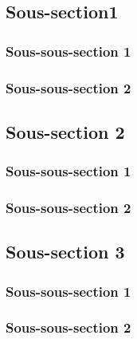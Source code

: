 
\subsection{Sous-section1}
    \subsubsection{Sous-sous-section 1}

    
    \subsubsection{Sous-sous-section 2}

    
    \subsection{Sous-section 2}
        \subsubsection{Sous-sous-section 1}


        \subsubsection{Sous-sous-section 2}


    \subsection{Sous-section 3}
        \subsubsection{Sous-sous-section 1}


        \subsubsection{Sous-sous-section 2}

